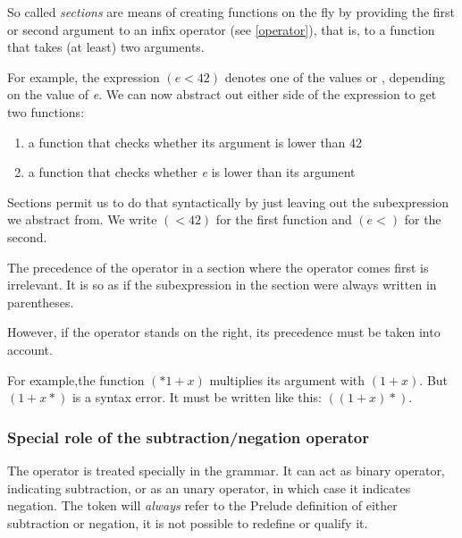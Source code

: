 So called \emph{sections} are means of creating functions on the fly by providing the first or second argument to an infix operator (see \autoref{operator}), that is, to a function that takes (at least) two arguments.

For example, the expression $(e < 42)$ denotes one of the values  or , depending on the value of \emph{e}.
We can now abstract out either side of the expression to get two functions:
\begin{enumerate}
\item a function that checks whether its argument is lower than 42
\item a function that checks whether \emph{e} is lower than its argument
\end{enumerate}
Sections permit us to do that syntactically by just leaving out the subexpression we abstract from. We write $( < 42)$ for the first function and $(e <)$ for the second.


The precedence of the operator in a section where the operator comes first is irrelevant. It is so as if the subexpression in the section were always written in parentheses.

However, if the operator stands on the right, its precedence must be taken into account.

For example,the function $(*1+x)$ multiplies its argument with $(1+x)$. But $(1+x*)$ is a syntax error. It must be written like this: $((1+x)*)$.

\subsubsection{Special role of the subtraction/negation operator}

The operator \term{$-$} is treated specially in the grammar. It can act as binary operator, indicating subtraction, or as an unary operator, in which case it indicates negation. 
The token \term{$-$} will \emph{always} refer to the Prelude definition of either subtraction or negation, it is not possible to redefine or qualify it.

